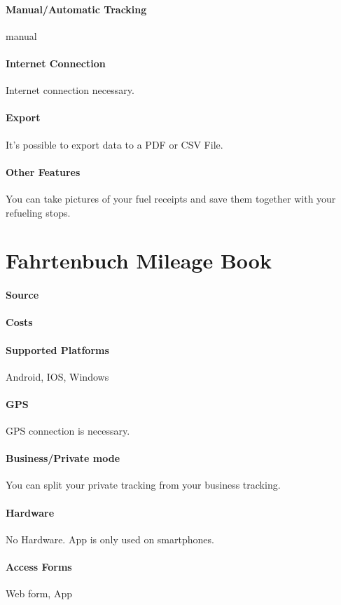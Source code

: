 \paragraph{Manual/Automatic Tracking} manual
\paragraph{Internet Connection} Internet connection necessary.
\paragraph{Export} It’s possible to export data to a PDF or CSV File.
\paragraph{Other Features} You can take pictures of your fuel receipts and save them together with your refueling stops.
\newpage
\section{Fahrtenbuch Mileage Book}
\paragraph{Source} 
\paragraph{Costs} 
\paragraph{Supported Platforms} Android, IOS, Windows
\paragraph{GPS} GPS connection is necessary.
\paragraph{Business/Private mode} You can split your private tracking from your business tracking.
\paragraph{Hardware} No Hardware. App is only used on smartphones.
\paragraph{Access Forms} Web form, App

